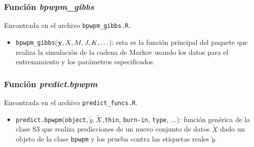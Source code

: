 \documentclass[../../Main/Main.tex]{subfiles}
\begin{document}
\subsubsection*{Función \textit{bpwpm\_gibbs}}
Encontrada en el archivo \verb|bpwpm_gibbs.R|.
\begin{itemize}[label={}]
	\item \verb|bpwpm_gibbs|($\mathbf{y},X,M,J,K,\ldots$): esta es la función principal del paquete que realiza la simulación de la cadena de Markov usando los datos para el entrenamiento y los parámetros especificados.
\end{itemize}

\subsubsection*{Función \textit{predict.bpwpm}}
Encontrada en el archivo \verb|predict_funcs.R|.
\begin{itemize}[label={}]
	\item \verb|predict.bpwpm|(\verb|object|,$\,\tilde{y},\tilde{X\,}$,\verb|thin|, \verb|burn-in|, \verb|type|, $\ldots$): función genérica de la clase S3 que realiza predicciones de un nuevo conjunto de datos $\tilde{X}$ dado un objeto de la clase \verb|bpwpm| y los prueba contra las etiquetas reales $\tilde{y}$.
\end{itemize}
\end{document}
